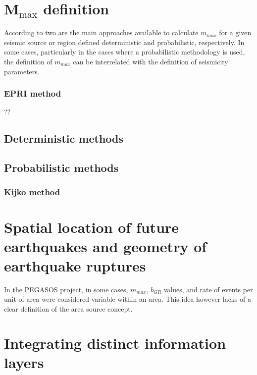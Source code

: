 \section{M$_{\text{max}}$ definition}
According to \cite{kijko04} two are the main approaches available to calculate 
$m_{max}$ for a given seismic source or region defined deterministic and 
probabilistic, respectively.
%
In some cases, particularly in the cases where a probabilistic methodology is used, 
the definition of $m_{max}$ can be interrelated with the definition of seismicity 
parameters.
%
\subsubsection{EPRI method  \citep{johnston94}}  
??
%
\subsection{Deterministic methods}
%
\subsection{Probabilistic methods}
\subsubsection{Kijko method \citep{kijko04}} 

%
\newpage
\section{Spatial location of future earthquakes and geometry of earthquake 
ruptures}
In the PEGASOS project, in some cases, $m_{max}$, $b_{GR}$ values, and rate of 
events per unit of area were considered variable within an area. This idea however
lacks of a clear definition of the area source concept.



\newpage
\section{Integrating distinct information layers}
